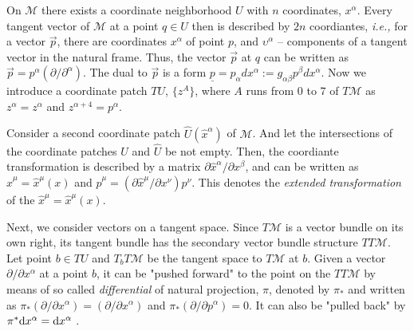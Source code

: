 \documentclass[11pt,a4paper,headinclude=true,DIV=14,BCOR=8mm,chapterprefix,listof=totoc,twoside,openright,abstracton]{scrbook}
\begin{document}
On $\mathcal{M}$ there exists a coordinate neighborhood $U$ with $n$ coordinates, $x^{\alpha}$. Every tangent vector of $\mathcal{M}$ at a point $q\in U$ then is described by $2n$ coordiantes, \textit{i.e.,} for a vector $\vec{p}$, there are coordinates $x^{\alpha}$ of point $p$, and $\upsilon^{\alpha}$ -- components of a tangent vector in the natural frame. Thus, the vector $\vec{p}$ at $q$ can be written as $ \vec{p} = p^{\alpha}(\partial / \partial^{\alpha} ) $. The dual to $\vec{p}$ is a form  $\underline{p} = p_{\alpha}dx^{\alpha} := g_{\alpha\beta}p^{\beta}dx^{\alpha}$. Now we introduce a coordinate patch $TU$, $\{z^A\}$, where $A$ runs from $0$ to $7$ of $T\mathcal{M}$ as $z^{\alpha} = z^{\alpha}$ and $z^{\alpha+4} = p^{\alpha}$. 

Consider a second coordinate patch $\hat{U}(\hat{x}^{\alpha})$ of $\mathcal{M}$. And let the intersections of the coordinate patches $U$ and $\hat{U}$ be not empty. Then, the coordiante transformation is described by a matrix $\partial \hat{x}^{\alpha} / \partial x^{\beta}$, and can be written as $\hat{x}^{\mu} = \hat{x}^{\mu}(x)$ and $\hat{p}^{\mu} = (\partial\hat{x}^{\mu} / \partial x^{\nu})p^{\nu}$. This denotes the \textit{extended transformation} of the $\hat{x}^{\mu} = \hat{x}^{\mu}(x)$. 

Next, we consider vectors on a tangent space. Since $T\mathcal{M}$ is a vector bundle on its own right, its tangent bundle has the secondary vector bundle structure $TT\mathcal{M}$. Let point $b\in TU$ and $T_b T\mathcal{M}$ be the tangent space to $T\mathcal{M}$ at $b$. Given a vector $\partial / \partial x^{\alpha}$ at a point $b$, it can be "pushed forward" to the point on the $TT\mathcal{M}$ by means of so called \textit{differential} of natural projection, $\pi$, denoted by $\pi_*$ and written as $\pi_* (\partial / \partial x^{\alpha} ) = (\partial / \partial x^{\alpha})$ and $\pi_* (\partial / \partial p^{\alpha}) = 0$. It can also be "pulled back" by $\pi^* {\text d} x^{\alpha} = {\text d} x^{\alpha}$ \cite{Frankel:2002}. 
\end{document}
